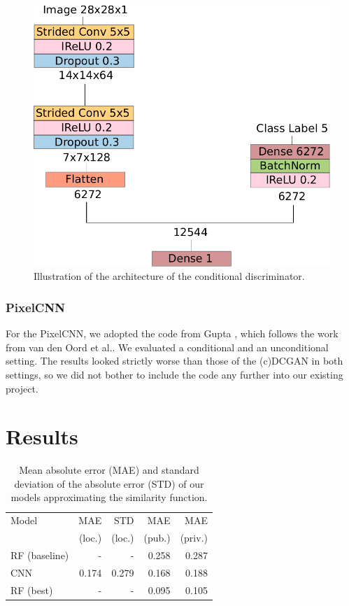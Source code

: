 \documentclass[10pt,conference,compsocconf]{IEEEtran}
\begin{document}
\begin{figure}
    \centering
    \includegraphics[width=0.75\columnwidth]{assets/cdis_arch.pdf}
    \caption{Illustration of the architecture of the conditional discriminator.}
    \label{fig:cdis_arch}
\end{figure}




\subsubsection{PixelCNN}
For the PixelCNN, we adopted the code from Gupta \cite{Gupta}, which follows the work from van den Oord et al.\@ \cite{PixelCNN}. We evaluated a conditional and an unconditional setting. The results looked strictly worse than those of the (c)DCGAN in both settings, so we did not bother to include the code any further into our existing project.

\section{Results}
\label{sec:results}

\begin{table}\centering
    \begin{tabular}{lrr|rr}
    \toprule
        Model           & MAE           & STD           &  MAE          &  MAE \\
                        & (loc.)        & (loc.)        & (pub.)        & (priv.) \\
    \midrule
        RF (baseline)   & -             & -             & \SI{0.258}{}  & \SI{0.287}{} \\
        CNN             & \SI{0.174}{}  & \SI{0.279}{}  & \SI{0.168}{}  & \SI{0.188}{} \\
        RF (best)       & -             & -             & \SI{0.095}{}  & \SI{0.105}{} \\
    \bottomrule
    \end{tabular}
\caption{Mean absolute error (MAE) and standard deviation of the absolute error (STD) of our models approximating the similarity function.}
\label{tab:SFA_MSS}
\end{table}
\end{document}
